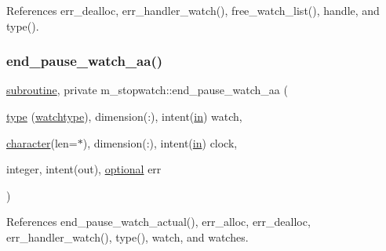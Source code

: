 References err\+\_\+dealloc, err\+\_\+handler\+\_\+watch(), free\+\_\+watch\+\_\+list(), handle, and type().

\mbox{\label{namespacem__stopwatch_a435c9495ff60ec1dc27d4b41f4030582}} 
\subsubsection{\texorpdfstring{end\+\_\+pause\+\_\+watch\+\_\+aa()}{end\_pause\_watch\_aa()}}
{\footnotesize\ttfamily \hyperlink{M__stopwatch_83_8txt_acfbcff50169d691ff02d4a123ed70482}{subroutine}, private m\+\_\+stopwatch\+::end\+\_\+pause\+\_\+watch\+\_\+aa (\begin{DoxyParamCaption}\item[{\hyperlink{stop__watch_83_8txt_a70f0ead91c32e25323c03265aa302c1c}{type} (\hyperlink{structm__stopwatch_1_1watchtype}{watchtype}), dimension(\+:), intent(\hyperlink{M__journal_83_8txt_afce72651d1eed785a2132bee863b2f38}{in})}]{watch,  }\item[{\hyperlink{option__stopwatch_83_8txt_abd4b21fbbd175834027b5224bfe97e66}{character}(len=$\ast$), dimension(\+:), intent(\hyperlink{M__journal_83_8txt_afce72651d1eed785a2132bee863b2f38}{in})}]{clock,  }\item[{integer, intent(out), \hyperlink{option__stopwatch_83_8txt_aa4ece75e7acf58a4843f70fe18c3ade5}{optional}}]{err }\end{DoxyParamCaption})\hspace{0.3cm}{\ttfamily [private]}}



References end\+\_\+pause\+\_\+watch\+\_\+actual(), err\+\_\+alloc, err\+\_\+dealloc, err\+\_\+handler\+\_\+watch(), type(), watch, and watches.

\mbox{\label{namespacem__stopwatch_a8bbf8dd3f4d63f2047e8bbd51d998a16}} 
